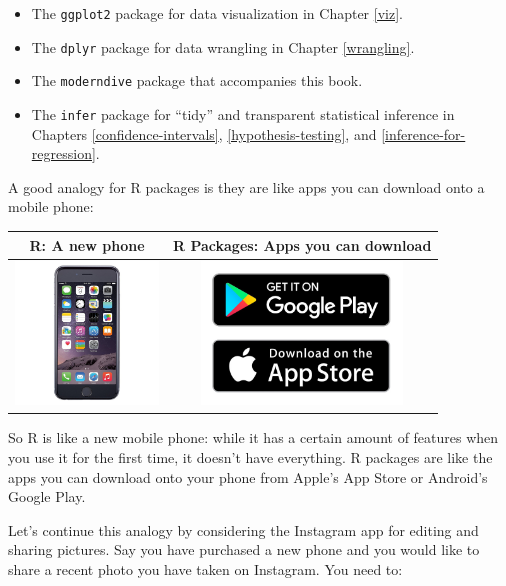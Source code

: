 \documentclass[12pt, krantz2,]{krantz}
\providecommand{\tightlist}{%
  \setlength{\itemsep}{0pt}\setlength{\parskip}{0pt}}
\begin{document}
\begin{itemize}
\tightlist
\item
  The \texttt{ggplot2} package for data visualization in Chapter \ref{viz}.
\item
  The \texttt{dplyr} package for data wrangling in Chapter \ref{wrangling}.
\item
  The \texttt{moderndive} package that accompanies this book.
\item
  The \texttt{infer} package for ``tidy'' and transparent statistical inference in Chapters \ref{confidence-intervals}, \ref{hypothesis-testing}, and \ref{inference-for-regression}.
\end{itemize}

A good analogy for R packages is they are like apps you can download onto a mobile phone:

\begin{longtable}[]{@{}cc@{}}
\toprule
R: A new phone & R Packages: Apps you can download\tabularnewline
\midrule
\endhead
\includegraphics[width=\textwidth,height=1.5in]{images/iphone.jpg} & \includegraphics[width=\textwidth,height=1.5in]{images/apps.jpg}\tabularnewline
\bottomrule
\end{longtable}

So R is like a new mobile phone: while it has a certain amount of features when you use it for the first time, it doesn't have everything. R packages are like the apps you can download onto your phone from Apple's App Store or Android's Google Play.

Let's continue this analogy by considering the Instagram app for editing and sharing pictures. Say you have purchased a new phone and you would like to share a recent photo you have taken on Instagram. You need to:
\end{document}
